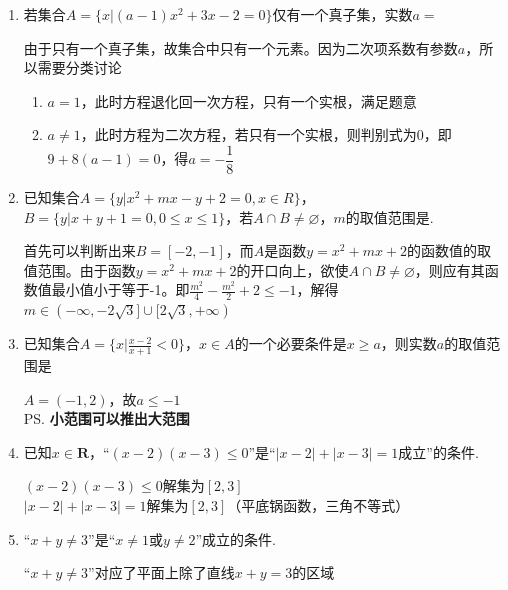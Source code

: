 \begin{enumerate}
\begin{jieda}
        易知可以先检验$t = 381$，此时原式为整数，而当$t > 381$易知原式不是整数，因此$t$最大值为381，此时对应于$a = 190$
    \end{jieda}
    \item 若集合$A = \{x | (a-1)x^2+3x-2 = 0\}$仅有一个真子集，实数$a = $
    \begin{jieda}
        由于只有一个真子集，故集合中只有一个元素。因为二次项系数有参数$a$，所以需要分类讨论\begin{enumerate}
            \item $a = 1$，此时方程退化回一次方程，只有一个实根，满足题意  
            \item $a \neq 1$，此时方程为二次方程，若只有一个实根，则判别式为0，即$9 + 8(a-1) = 0$，得$a = -\dfrac{1}{8}$
        \end{enumerate}
    \end{jieda}
    \item 已知集合$A=\{y | x^2+mx-y+2=0, x \in R\}$， $B=\{y | x+y+1=0, 0 \leq x \leq 1\}$，若$A \cap B \neq \varnothing$，$m$的取值范围是\blkda[5]{$(-\infty, -2\sqrt{3}] \cup [2\sqrt{3}, +\infty)$}. 
        \begin{jieda}
            首先可以判断出来$B = [-2, -1]$，而$A$是函数$y = x^2+mx+2$的函数值的取值范围。由于函数$y = x^2+mx+2$的开口向上，欲使$A \cap B \neq \varnothing$，则应有其函数值最小值小于等于-1。即$\frac{m^2}{4} - \frac{m^2}{2} + 2 \leq -1$，解得$m \in (-\infty, -2\sqrt{3}] \cup [2\sqrt{3}, +\infty)$
        \end{jieda}
    \item 已知集合$A = \{x | \frac{x-2}{x+1} < 0\}$，$x \in A$的一个必要条件是$x \geq a$，则实数$a$的取值范围是
    \begin{jieda}
        $A = (-1, 2)$，故$a \leq -1$ \\
        \ps \textbf{小范围可以推出大范围}
    \end{jieda}
    \item 已知$x \in \mathbf{R}$，“$(x-2)(x-3) \leq 0$”是“$|x-2|+|x-3| = 1$成立”的条件.
    \begin{jieda}
        $(x-2)(x-3) \leq 0$解集为$[2, 3]$ \\
        $|x-2|+|x-3| = 1$解集为$[2, 3]$（平底锅函数，三角不等式）
    \end{jieda}
    \item “$x+y \neq 3$”是“$x \neq 1 \mbox{或} y \neq 2$”成立的条件.
    \begin{jieda}
        “$x+y \neq 3$”对应了平面上除了直线$x + y = 3$的区域 \\

\end{jieda}
\end{enumerate}
